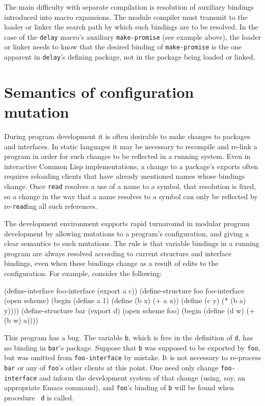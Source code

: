 The main difficulty with separate compilation is resolution of
auxiliary bindings introduced into macro expansions.  The module
compiler must transmit to the loader or linker the search path by
which such bindings are to be resolved.  In the case of the {\tt delay}
macro's auxiliary {\tt make-promise} (see example above), the loader
or linker needs to know that the desired binding of {\tt make-promise}
is the one apparent in {\tt delay}'s defining package, not in the
package being loaded or linked.


\section{Semantics of configuration mutation}

During program development it is often desirable to make changes to
packages and interfaces.  In static languages it may be necessary to
recompile and re-link a program in order for such changes to be
reflected in a running system.  Even in interactive Common Lisp
implementations, a change to a package's exports often requires
reloading clients that have already mentioned names whose bindings
change.  Once {\tt read} resolves a use of a name to a symbol, that
resolution is fixed, so a change in the way that a name resolves to a
symbol can only be reflected by re-{\tt read}ing all such references.

The \hack{} development environment supports rapid turnaround in
modular program development by allowing mutations to a program's
configuration, and giving a clear semantics to such mutations.  The
rule is that variable bindings in a running program are always
resolved according to current structure and interface bindings, even
when these bindings change as a result of edits to the configuration.
For example, consider the following:
\begin{example}
(define-interface foo-interface (export a c))
(define-structure foo foo-interface
  (open scheme)
  (begin (define a 1)
         (define (b x) (+ a x))
         (define (c y) (* (b a) y))))
(define-structure bar (export d)
  (open scheme foo)
  (begin (define (d w) (+ (b w) a))))
\end{example}
This program has a bug.  The variable {\tt b}, which is free in the
definition of {\tt d}, has no binding in {\tt bar}'s package.  Suppose
that {\tt b} was supposed to be exported by {\tt foo}, but was omitted
from {\tt foo-interface} by mistake.  It is not necessary to
re-process {\tt bar} or any of {\tt foo}'s other clients at this point.
One need only change {\tt foo-interface} and inform the development
system of that change (using, say, an appropriate Emacs command),
and {\tt foo}'s binding of {\tt b} will be found when procedure {\tt
d} is called.

